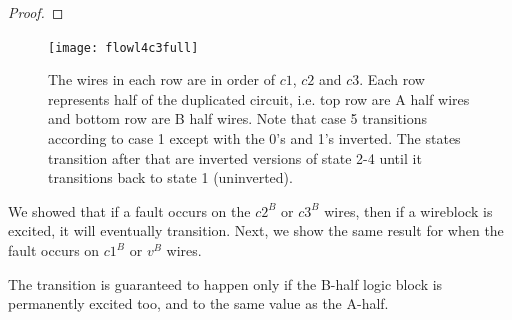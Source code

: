 \documentclass[12pt]{report}
\begin{document}
\begin{proof}
\end{proof}

\begin{figure}
\centering
\texttt{[image: flowl4c3full]}
\caption{The wires in each row are in order of $c1$, $c2$ and $c3$. Each row represents half of the duplicated circuit, i.e. top row are A half wires and bottom row are B half wires. Note that case 5 transitions according to case 1 except with the 0's and 1's inverted. The states transition after that are inverted versions of state 2-4 until it transitions back to state 1 (uninverted).}
\label{fig:l4}
\end{figure}

We showed that if a fault occurs on the $c2^B$ or $c3^B$ wires, then if a wireblock is excited, it will eventually transition. 
Next, we show the same result for when the fault occurs on $c1^B$ or $v^B$ wires. 

The transition is guaranteed to happen only if the B-half logic block is permanently excited too, and to the same value as the A-half.

\end{document}
